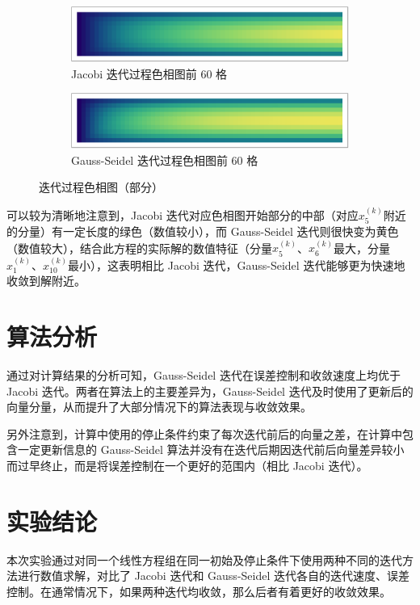\documentclass[11pt]{article}
\begin{document}
\begin{figure}[h]
    \centering
    \begin{subfigure}{\textwidth}
        \includegraphics{Figure/Jacobi_60.pdf}
        \caption{Jacobi 迭代过程色相图前 60 格}
        \label{figure:Jacobi-2}
        \label{}
    \end{subfigure}
    \begin{subfigure}{\textwidth}
        \includegraphics{Figure/Gauss_Seidel_60.pdf}
        \caption{Gauss-Seidel 迭代过程色相图前 60 格}
        \label{figure:Gauss-Seidel-2}
        \label{}
    \end{subfigure}
    \caption{迭代过程色相图（部分）}
    \label{figure:2}
\end{figure}
可以较为清晰地注意到，Jacobi 迭代对应色相图开始部分的中部（对应$x^{(k)}_5$附近的分量）有一定长度的绿色（数值较小），而 Gauss-Seidel 迭代则很快变为黄色（数值较大），结合此方程的实际解的数值特征（分量$x^{(k)}_5$、$x^{(k)}_6$最大，分量$x^{(k)}_1$、$x^{(k)}_{10}$最小），这表明相比 Jacobi 迭代，Gauss-Seidel 迭代能够更为快速地收敛到解附近。

\section{算法分析}
通过对计算结果的分析可知，Gauss-Seidel 迭代在误差控制和收敛速度上均优于 Jacobi 迭代。两者在算法上的主要差异为，Gauss-Seidel 迭代及时使用了更新后的向量分量，从而提升了大部分情况下的算法表现与收敛效果。

另外注意到，计算中使用的停止条件约束了每次迭代前后的向量之差，在计算中包含一定更新信息的 Gauss-Seidel 算法并没有在迭代后期因迭代前后向量差异较小而过早终止，而是将误差控制在一个更好的范围内（相比 Jacobi 迭代）。

\section{实验结论}
本次实验通过对同一个线性方程组在同一初始及停止条件下使用两种不同的迭代方法进行数值求解，对比了 Jacobi 迭代和 Gauss-Seidel 迭代各自的迭代速度、误差控制。在通常情况下，如果两种迭代均收敛，那么后者有着更好的收敛效果。
\end{document}
